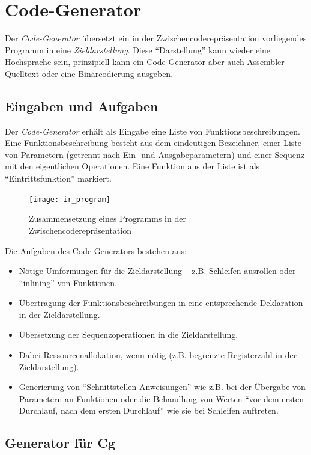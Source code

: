 \documentclass[twoside,a4paper,fleqn,12pt]{book}
\begin{document}
\clearpage
\section{Code-Generator}

Der \emph{Code-Generator} übersetzt ein in der Zwischencoderepräsentation vorliegendes Programm in eine \emph{Zieldarstellung}.
Diese "`Darstellung"' kann wieder eine Hochsprache sein, prinzipiell kann ein Code-Generator aber auch Assembler-Quelltext oder eine
Binärcodierung ausgeben.

\subsection{Eingaben und Aufgaben}

Der \emph{Code-Generator} erhält als Eingabe eine Liste von Funktionsbeschreibungen.
Eine Funktionsbeschreibung besteht aus dem eindeutigen Bezeichner, einer Liste von Parametern (getrennt nach Ein- und Ausgabeparametern)
und einer Sequenz mit den eigentlichen Operationen. Eine Funktion aus der Liste ist als "`Eintrittsfunktion"' markiert.

\begin{figure}[h]
   \centering
  \texttt{[image: ir\_program]}
  \caption{Zusammensetzung eines Programms in der Zwischencoderepräsentation}
  \label{fig:ir_program}
\end{figure}

\newpage
Die Aufgaben des Code-Generators bestehen aus:
\begin{itemize}
\item Nötige Umformungen für die Zieldarstellung -- z.B. Schleifen ausrollen oder ``inlining'' von Funktionen.
\item Übertragung der Funktionsbeschreibungen in eine entsprechende Deklaration in der Zieldarstellung.
\item Übersetzung der Sequenzoperationen in die Zieldarstellung. 
\item Dabei Ressourcenallokation, wenn nötig (z.B. begrenzte Registerzahl in der Zieldarstellung).
\item Generierung von "`Schnittstellen-Anweisungen"' wie z.B. bei der Übergabe von Parametern an Funktionen
oder die Behandlung von Werten "`vor dem ersten Durchlauf, nach dem ersten Durchlauf"' wie sie bei Schleifen
auftreten.
\end{itemize}

\subsection{Generator für Cg}
\end{document}
